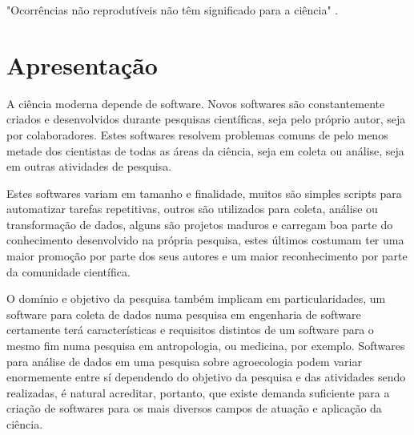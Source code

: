 
"Ocorrências não reprodutíveis não têm significado para a ciência" \cite{popper2004logica}.

%
%


\section{Apresentação}

A ciência moderna depende de software. Novos softwares são constantemente
criados e desenvolvidos durante pesquisas científicas, seja pelo próprio autor,
seja por colaboradores. Estes softwares resolvem
problemas comuns de pelo menos metade dos cientistas de todas as áreas da
ciência, seja em coleta ou análise, seja em outras atividades de pesquisa.

Estes softwares variam em tamanho e finalidade, muitos são simples
scripts para automatizar tarefas repetitivas, outros são utilizados para
coleta, análise ou transformação de dados, alguns são projetos maduros e
carregam boa parte do conhecimento desenvolvido na própria pesquisa, estes
últimos costumam ter uma maior promoção por parte dos seus autores e um maior
reconhecimento por parte da comunidade científica.

O domínio e objetivo da pesquisa também implicam em particularidades,
um software para coleta de dados numa pesquisa em engenharia de
software certamente terá características e requisitos distintos de um software
para o mesmo fim numa pesquisa em antropologia, ou medicina, por exemplo.
Softwares para análise de dados em uma pesquisa sobre agroecologia podem variar
enormemente entre sí dependendo do objetivo da pesquisa e das atividades sendo
realizadas, é natural acreditar, portanto, que existe demanda suficiente para a
criação de softwares para os mais diversos campos de atuação e aplicação da
ciência.

